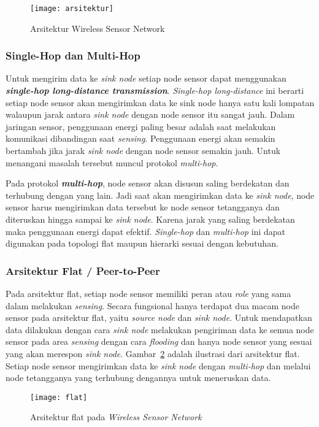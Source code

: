 \begin{figure} [H]
	\centering  
	\texttt{[image: arsitektur]}  
	\caption[Arsitektur Wireless Sensor Network]{Arsitektur Wireless Sensor Network} 
	\label{fig:arsitektur} 
\end{figure} 

\subsubsection{Single-Hop dan Multi-Hop \cite{protocol:0:protocol}}
Untuk mengirim data ke \textit{sink node} setiap node sensor dapat menggunakan \textbf{\textit{single-hop long-distance transmission}}. \textit{Single-hop long-distance} ini berarti setiap node sensor akan mengirimkan data ke sink node hanya satu kali lompatan walaupun jarak antara \textit{sink node} dengan node sensor itu sangat jauh. Dalam jaringan sensor, penggunaan energi paling besar adalah saat melakukan komunikasi dibandingan saat \textit{sensing}. Penggunaan energi akan semakin bertambah jika jarak \textit{sink node} dengan node sensor semakin jauh. Untuk menangani masalah tersebut muncul protokol \textit{multi-hop}.

Pada protokol \textbf{\textit{multi-hop}}, node sensor akan disusun saling berdekatan dan terhubung dengan yang lain. Jadi saat akan mengirimkan data ke \textit{sink node}, node sensor harus mengirimkan data tersebut ke node sensor tetangganya dan diteruskan hingga sampai ke \textit{sink node}. Karena jarak yang saling berdekatan maka penggunaan energi dapat efektif. \textit{Single-hop} dan \textit{multi-hop} ini dapat digunakan pada topologi flat maupun hierarki sesuai dengan kebutuhan.

\subsubsection{Arsitektur Flat / Peer-to-Peer \cite{a_wireless_sensor}}
Pada arsitektur flat, setiap node sensor memiliki peran atau \textit{role} yang sama dalam melakukan \textit{sensing}. Secara fungsional hanya terdapat dua macam node sensor pada arsitektur flat, yaitu \textit{source node} dan \textit{sink node}. Untuk mendapatkan data dilakukan dengan cara \textit{sink node} melakukan pengiriman data ke semua node sensor pada area \textit{sensing} dengan cara \textit{flooding} dan hanya node sensor yang sesuai yang akan merespon \textit{sink node}. Gambar~\ref{fig:flat} adalah ilustrasi dari arsitektur flat. Setiap node sensor mengirimkan data ke \textit{sink node} dengan \textit{multi-hop} dan melalui node tetangganya yang terhubung dengannya untuk meneruskan data.
\begin{figure} [H]
	\centering  
	\texttt{[image: flat]}  
	\caption[Arsitektur flat pada \textit{Wireless Sensor Network}]{Arsitektur flat pada \textit{Wireless Sensor Network}} 
	\label{fig:flat} 
\end{figure} 

